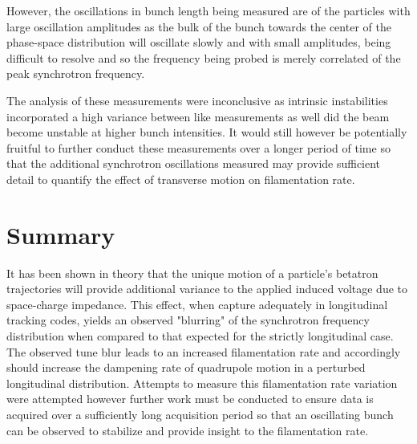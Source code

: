 However, the oscillations in bunch length being measured are of the particles with large oscillation amplitudes as the bulk of the bunch towards the center of the phase-space distribution will oscillate slowly and with small amplitudes, being difficult to resolve and so the frequency being probed is merely correlated of the peak synchrotron frequency.

The analysis of these measurements were inconclusive as intrinsic instabilities incorporated a high variance between like measurements as well did the beam become unstable at higher bunch intensities. It would still however be potentially fruitful to further conduct these measurements over a longer period of time so that the additional synchrotron oscillations measured may provide sufficient detail to quantify the effect of transverse motion on filamentation rate.

\section{Summary}

It has been shown in theory that the unique motion of a particle's betatron trajectories will provide additional variance to the applied induced voltage due to space-charge impedance. This effect, when capture adequately in longitudinal tracking codes, yields an observed "blurring" of the synchrotron frequency distribution when compared to that expected for the strictly longitudinal case. The observed tune blur leads to an increased filamentation rate and accordingly should increase the dampening rate of quadrupole motion in a perturbed longitudinal distribution. Attempts to measure this filamentation rate variation were attempted however further work must be conducted to ensure data is acquired over a sufficiently long acquisition period so that an oscillating bunch can be observed to stabilize and provide insight to the filamentation rate.